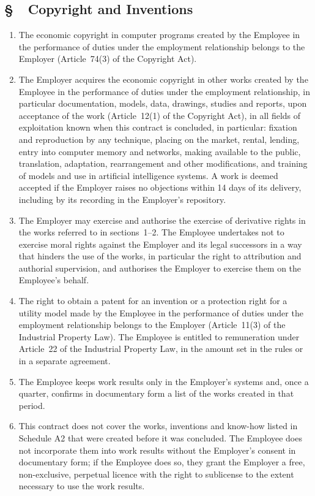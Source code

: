 \documentclass[11pt,a4paper]{report}
\newcounter{paragraf}
\newcommand{\paragraf}[1]{%
  \refstepcounter{paragraf}%
  \Needspace{5\baselineskip}%
  \subsection*{\S~\theparagraf\ #1}%
}
\newenvironment{ContractClause}[1]{\paragraf{#1}}{\par}
\begin{document}
\begin{ContractClause}{Copyright and Inventions}
\label{a:ip}
\begin{enumerate}
  \item The economic copyright in computer programs created by the Employee in the performance of duties under the employment relationship belongs to the Employer (Article~74(3) of the Copyright Act).
  \item The Employer acquires the economic copyright in other works created by the Employee in the performance of duties under the employment relationship, in particular documentation, models, data, drawings, studies and reports, upon acceptance of the work (Article~12(1) of the Copyright Act), in all fields of exploitation known when this contract is concluded, in particular: fixation and reproduction by any technique, placing on the market, rental, lending, entry into computer memory and networks, making available to the public, translation, adaptation, rearrangement and other modifications, and training of models and use in artificial intelligence systems. A work is deemed accepted if the Employer raises no objections within 14 days of its delivery, including by its recording in the Employer's repository.
  \item The Employer may exercise and authorise the exercise of derivative rights in the works referred to in sections~1--2. The Employee undertakes not to exercise moral rights against the Employer and its legal successors in a way that hinders the use of the works, in particular the right to attribution and authorial supervision, and authorises the Employer to exercise them on the Employee's behalf.
  \item The right to obtain a patent for an invention or a protection right for a utility model made by the Employee in the performance of duties under the employment relationship belongs to the Employer (Article~11(3) of the Industrial Property Law). The Employee is entitled to remuneration under Article~22 of the Industrial Property Law, in the amount set in the rules or in a separate agreement.
  \item The Employee keeps work results only in the Employer's systems and, once a quarter, confirms in documentary form a list of the works created in that period.
  \item This contract does not cover the works, inventions and know-how listed in Schedule A2 that were created before it was concluded. The Employee does not incorporate them into work results without the Employer's consent in documentary form; if the Employee does so, they grant the Employer a free, non-exclusive, perpetual licence with the right to sublicense to the extent necessary to use the work results.
\end{enumerate}
\end{ContractClause}
\end{document}
